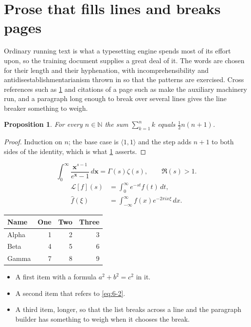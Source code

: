 \documentclass[11pt,a4paper]{report}
\theoremstyle{plain}
\newtheorem{proposition}{Proposition}[chapter]
\newcommand{\vecn}[1]{\mathbf{#1}}
\newcommand{\pairs}[2]{\langle #1,#2\rangle}
\begin{document}
\section{Prose that fills lines and breaks pages}
\label{sec:prose6-2}
Ordinary running text is what a typesetting engine spends most of its effort
upon, so the training document supplies a great deal of it. The words are
chosen for their length and their hyphenation, with incomprehensibility and
antidisestablishmentarianism thrown in so that the patterns are exercised.
Cross references such as \cref{sec:prose6-2} and citations of a page such
as \pageref{sec:prose6-2} make the auxiliary machinery run, and a
paragraph long enough to break over several lines gives the line breaker
something to weigh.
\begin{proposition}\label{prop:6-2}
For every $n\in\mathbb{N}$ the sum $\sum_{k=1}^{n}k$ equals
$\tfrac{1}{2}n(n+1)$.
\end{proposition}
\begin{proof}
Induction on $n$; the base case is $\pairs{1}{1}$ and the step adds $n+1$ to
both sides of the identity, which is what \cref{prop:6-2} asserts.
\end{proof}
\begin{equation}\label{eq:6-2}
  \int_{0}^{\infty}\frac{\vecn{x}^{s-1}}{e^{\vecn{x}}-1}\,d\vecn{x}
    = \Gamma(s)\zeta(s),\qquad \Re(s)>1 .
\end{equation}
\begin{align}
  \mathcal{L}[f](s) &= \int_{0}^{\infty} e^{-st} f(t)\,dt, \\
  \widehat{f}(\xi)  &= \int_{-\infty}^{\infty} f(x) e^{-2\pi i x\xi}\,dx .
\end{align}
\par\noindent\begin{center}
\begin{tabular}{lrrr}
\hline
Name & One & Two & Three \\
\hline
Alpha & 1 & 2 & 3 \\
Beta & 4 & 5 & 6 \\
Gamma & 7 & 8 & 9 \\
\hline
\end{tabular}
\end{center}
\begin{itemize}
  \item A first item with a formula $a^2+b^2=c^2$ in it.
  \item A second item that refers to \eqref{eq:6-2}.
  \item A third item, longer, so that the list breaks across a line and the
    paragraph builder has something to weigh when it chooses the break.
\end{itemize}
\end{document}

